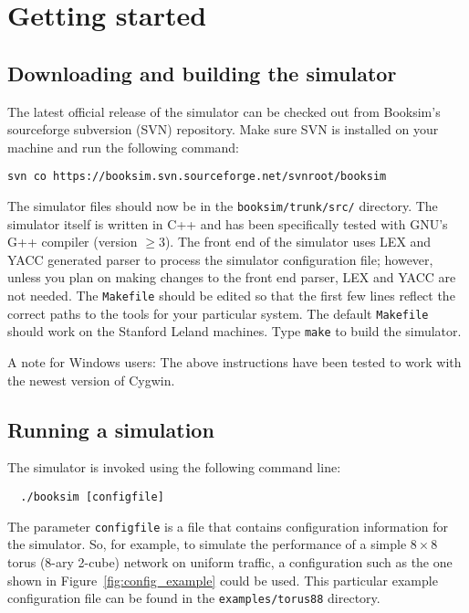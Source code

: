 \documentclass[11pt]{article}
\begin{document}
\section{Getting started}
\label{sec:get_started}

\subsection{Downloading and building the simulator}
\label{sec:download}

The latest official release of the simulator can be checked out from Booksim's sourceforge subversion (SVN) repository. Make sure SVN is installed on your machine and run the following command:
\begin{verbatim}
svn co https://booksim.svn.sourceforge.net/svnroot/booksim
\end{verbatim}

The simulator files should now be in the \texttt{booksim/trunk/src/} directory.
The simulator itself is written in C++ and has been specifically tested with GNU's G++ compiler (version $\ge3$).
The front end of the simulator uses LEX and YACC generated parser to process the simulator configuration file; however, unless you plan on making changes to the front end parser, LEX and YACC are not needed.
The \texttt{Makefile} should be edited so that the first few lines reflect the correct paths to the tools for your particular system.
The default \texttt{Makefile} should work on the Stanford Leland machines.
Type \texttt{make} to build the simulator. 

A note for Windows users:
The above instructions have been tested to work with the newest version of Cygwin.

\subsection{Running a simulation}
\label{sec:run_example}

The simulator is invoked using the following command line:
\begin{verbatim}
  ./booksim [configfile]
\end{verbatim}

The parameter \texttt{configfile} is a file that contains configuration information for the simulator.
So, for example, to simulate the performance of a simple $8 \times 8$ torus (8-ary 2-cube) network on uniform traffic, a configuration such as the one shown in Figure~\ref{fig:config_example} could be used.
This particular example configuration file can be found in the \texttt{examples/torus88} directory.
\end{document}
